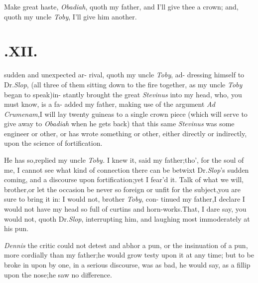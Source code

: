 \documentclass{article}
\begin{document}
\tsh Make great haste, \textit{Obadiah}, quoth my father,
and I’ll give thee a crown;\tsk\break
and, quoth my uncle \textit{Toby}, I’ll give him another.

\bigskip

\section{.\enspace  XII.}

 sudden and unexpected ar-\break
rival, quoth my uncle \textit{Toby}, ad-\break
dressing himself to Dr.\@ \textit{Slop},
(all three of them sitting down to the fire together, as my uncle
\textit{Toby} began to speak)\tsk in-\break
stantly brought the great \textit{Stevinus} into\break
my head, who, you must know, is a fa-
added my father, making use of the ar\-gument \textit{Ad
Crumenam},\tsh I will lay\break
twenty guineas to a single crown piece (which will serve to
give away to \textit{Obadiah} when he gets back) that this
same \textit{Stevinus} was some engineer or other,\tsk\break
or has wrote something or other, either directly or indirectly,
upon the science of\break
fortification.

He has so,\tsk replied my uncle \textit{Toby.}\tsk\break
I knew it, said my father;\tsk tho’, for the soul of me, I cannot see what kind
of connection there can be betwixt Dr.\@ \textit{Slop}’s sudden
coming, and a discourse upon fortification;\tsk yet I
fear’d it.\tsk\break
Talk of what we will, brother,\tsk or let the occasion be
never so foreign or unfit for the subject,\tsk you are sure
to bring it in: I would not, brother \textit{Toby}, con-
tinued my father,\tsh I declare I would not have my head
so full of curtins and horn-works.\tsh That, I dare say, you
would not, quoth Dr.\@ \textit{Slop}, interrupting him, and
laughing most immoderately at\break
his pun.

\textit{Dennis} the critic could not detest and abhor a pun, or
the insinuation of a pun, more cordially than my father;\tsh he
would grow testy upon it at any time;\tsk\break
but to be broke in upon by one, in a serious discourse, was
as bad, he would say, as a fillip upon the nose;\tsh he saw\break
no difference.
\end{document}
